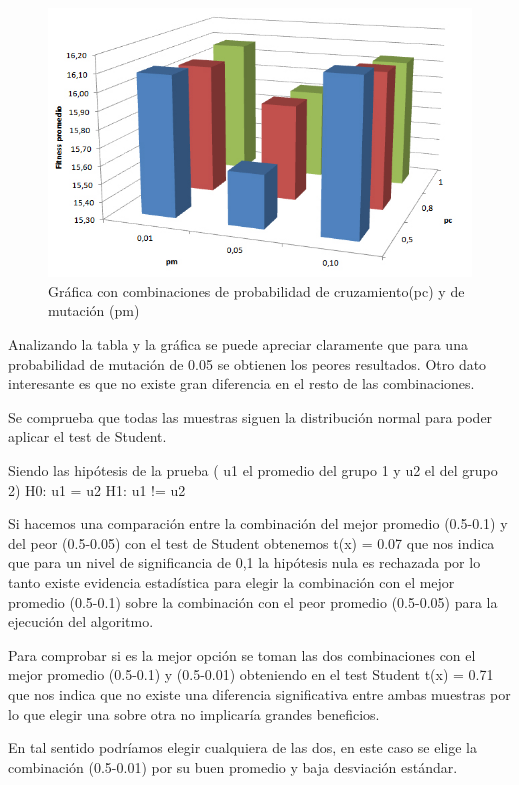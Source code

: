  
 

\begin{figure}[h]
	\centering
	\includegraphics[width=0.7\linewidth]{Figures/grafica_mutacion_cruzamiento}
	\caption{Gráfica con combinaciones de probabilidad de cruzamiento(pc) y de mutación (pm)}
	\label{fig:grafica_mutacion_cruzamiento}
\end{figure}

Analizando la tabla y la gráfica se puede apreciar claramente que para una probabilidad de mutación de 0.05 se obtienen los peores resultados. Otro dato interesante es que no existe gran diferencia en el resto de las combinaciones.

Se comprueba que todas las muestras siguen la distribución normal  para poder aplicar el test de Student.

Siendo las hipótesis de la prueba ( u1 el promedio del  grupo 1 y u2 el del grupo 2) \newline
H0: u1  = u2  \newline
H1: u1 != u2 \newline

Si hacemos una comparación entre la combinación del mejor promedio (0.5-0.1) y del peor (0.5-0.05) con el test de Student obtenemos t(x) = 0.07 que nos indica que para un nivel de significancia de  0,1 la hipótesis nula es rechazada por lo tanto existe evidencia estadística para elegir la combinación con el mejor promedio (0.5-0.1) sobre la combinación con el peor promedio (0.5-0.05) para la ejecución del algoritmo.

Para comprobar si es la mejor opción  se toman las dos combinaciones con el mejor promedio (0.5-0.1) y (0.5-0.01) obteniendo en el test Student t(x) = 0.71 que nos indica que no existe una diferencia significativa entre ambas muestras por lo que elegir una sobre otra no implicaría grandes beneficios.

En tal sentido podríamos elegir cualquiera de las dos, en este caso se elige  la combinación (0.5-0.01) por su buen promedio y baja desviación estándar.



